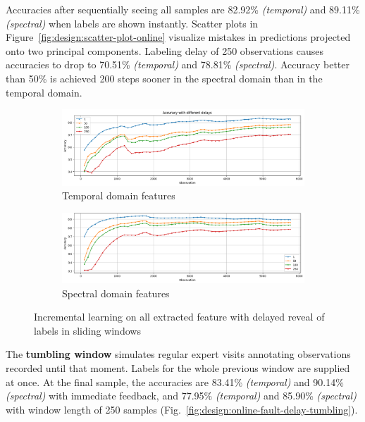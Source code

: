 Accuracies after sequentially seeing all samples are 82.92\% \emph{(temporal)} and 89.11\% \emph{(spectral)} when labels are shown instantly. Scatter plots in Figure~\ref{fig:design:scatter-plot-online} visualize mistakes in predictions projected onto two principal components. Labeling delay of 250 observations causes accuracies to drop to 70.51\% \emph{(temporal)} and 78.81\% \emph{(spectral)}. Accuracy better than 50\% is achieved 200 steps sooner in the spectral domain than in the temporal domain.
	
\begin{figure}[ht]
    \centering
    \begin{subfigure}[b]{0.49\textwidth}
        \includegraphics[width=\textwidth]{assets/design/gradual-learning-accuracy-delay-temporal-domain-fault.png}
        \caption{Temporal domain features}
    \end{subfigure}
    \hfill
    \begin{subfigure}[b]{0.49\textwidth}
        \includegraphics[width=\textwidth]{assets/design/gradual-learning-accuracy-delay-spectral-domain-fault.png}
        \caption{Spectral domain features}
    \end{subfigure}
    \caption{Incremental learning on all extracted feature with delayed reveal of labels in sliding windows}
    \label{fig:design:online-fault-delay-sliding}
\end{figure}
	
	
The \textbf{tumbling window} simulates regular expert visits annotating observations recorded until that moment. Labels for the whole previous window are supplied at once. At the final sample, the accuracies are 83.41\% \emph{(temporal)} and 90.14\% \emph{(spectral)} with immediate feedback, and 77.95\% \emph{(temporal)} and 85.90\% \emph{(spectral)} with window length of 250 samples (Fig.~\ref{fig:design:online-fault-delay-tumbling}). 

